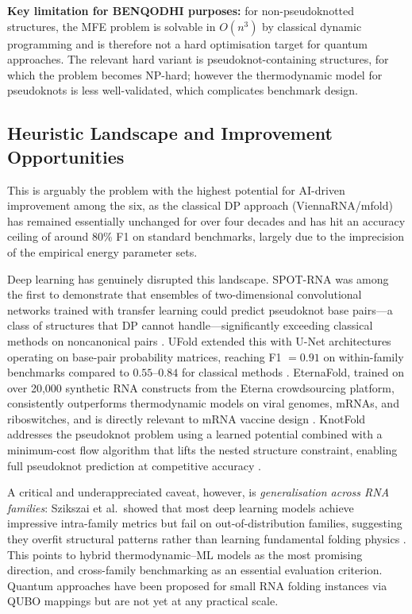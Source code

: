\documentclass[11pt]{article}
\begin{document}
\textbf{Key limitation for BENQODHI purposes:} for non-pseudoknotted structures, the
MFE problem is solvable in $O(n^3)$ by classical dynamic programming and is therefore
not a hard optimisation target for quantum approaches. The relevant hard variant is
pseudoknot-containing structures, for which the problem becomes NP-hard; however the
thermodynamic model for pseudoknots is less well-validated, which complicates
benchmark design.

\subsection*{Heuristic Landscape and Improvement Opportunities}

This is arguably the problem with the highest potential for AI-driven improvement among 
the six, as the classical DP approach (ViennaRNA/mfold) has remained essentially 
unchanged for over four decades and has hit an accuracy ceiling of around 80\% F1 
on standard benchmarks, largely due to the imprecision of the empirical energy 
parameter sets.

Deep learning has genuinely disrupted this landscape. SPOT-RNA was among the first 
to demonstrate that ensembles of two-dimensional convolutional networks trained with 
transfer learning could predict pseudoknot base pairs---a class of structures that 
DP cannot handle---significantly exceeding classical methods on noncanonical pairs 
\cite{SPOTRNA2019}. UFold extended this with U-Net architectures operating on 
base-pair probability matrices, reaching F1 $= 0.91$ on within-family benchmarks 
compared to $0.55$--$0.84$ for classical methods \cite{UFold2022}. 
EternaFold, trained on over 20,000 synthetic RNA constructs from the Eterna 
crowdsourcing platform, consistently outperforms thermodynamic models on viral 
genomes, mRNAs, and riboswitches, and is directly relevant to mRNA vaccine design 
\cite{Wayment2022}.
KnotFold addresses the pseudoknot problem using a learned potential combined 
with a minimum-cost flow algorithm that lifts the nested structure constraint, 
enabling full pseudoknot prediction at competitive accuracy \cite{KnotFold2024}.

A critical and underappreciated caveat, however, is \emph{generalisation across 
RNA families}: Szikszai et al.\ showed that most deep learning models achieve 
impressive intra-family metrics but fail on out-of-distribution families, 
suggesting they overfit structural patterns rather than learning fundamental 
folding physics \cite{Szikszai2022}. This points to hybrid thermodynamic--ML models 
as the most promising direction, and cross-family benchmarking as an essential 
evaluation criterion. Quantum approaches have been proposed for small RNA folding 
instances via QUBO mappings but are not yet at any practical scale.
\end{document}

